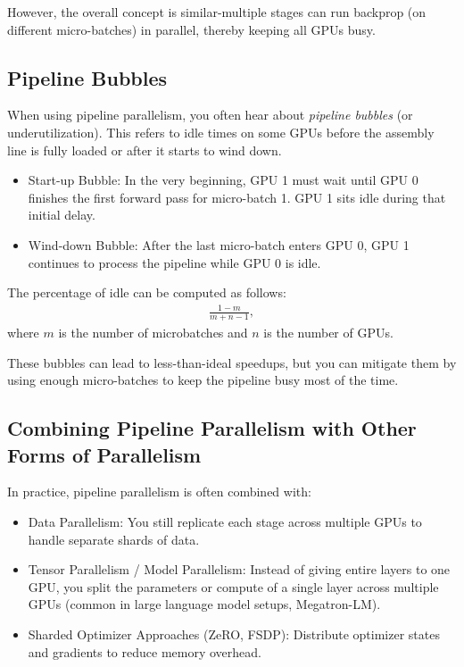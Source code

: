 {However, the overall concept is similar-multiple stages can run backprop (on different micro-batches) in parallel, thereby keeping all GPUs busy.


\subsection{Pipeline Bubbles}

When using pipeline parallelism, you often hear about \textit{pipeline bubbles} (or underutilization). This refers to idle times on some GPUs before the assembly line is fully loaded or after it starts to wind down. 
\begin{itemize}
	\item Start-up Bubble: In the very beginning, GPU 1 must wait until GPU 0 finishes the first forward pass for micro-batch 1. GPU 1 sits idle during that initial delay.  
	\item Wind-down Bubble: After the last micro-batch enters GPU 0, GPU 1 continues to process the pipeline while GPU 0 is idle.
\end{itemize}

The percentage of idle can be computed as follows:
\begin{align*}
	\frac{1-m}{m+n-1},
\end{align*}
where $m$ is the number of microbatches and $n$ is the number of GPUs. 


These bubbles can lead to less-than-ideal speedups, but you can mitigate them by using enough micro-batches to keep the pipeline busy most of the time.

\subsection{Combining Pipeline Parallelism with Other Forms of Parallelism}

In practice, pipeline parallelism is often combined with:
\begin{itemize}
	\item Data Parallelism: You still replicate each stage across multiple GPUs to handle separate shards of data.  
	\item Tensor Parallelism / Model Parallelism: Instead of giving entire layers to one GPU, you split the parameters or compute of a single layer across multiple GPUs (common in large language model setups, \eg Megatron-LM).  
	\item Sharded Optimizer Approaches (\eg ZeRO, FSDP): Distribute optimizer states and gradients to reduce memory overhead.
\end{itemize}


}
